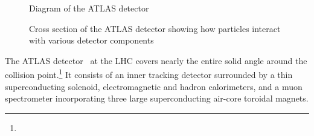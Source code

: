 \begin{figure}[ht]
\centering
{}
\caption{Diagram of the ATLAS detector \cite{DetectorImage}}
\end{figure}

\begin{figure}[ht]
\centering
{}
\caption{Cross section of the ATLAS detector showing how particles interact with various detector components \cite{ShowerImage}}
\end{figure}

The ATLAS detector~\cite{PERF-2007-01} at the LHC covers nearly the entire solid angle around the collision point.\footnote{\AtlasCoordFootnote}
It consists of an inner tracking detector surrounded by a thin superconducting solenoid, electromagnetic and hadron calorimeters,
and a muon spectrometer incorporating three large superconducting air-core toroidal magnets.

